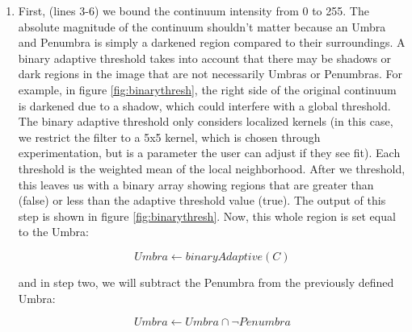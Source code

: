 \begin{enumerate}
    \item First, (lines 3-6) we bound the continuum intensity from 0 to 255. The absolute magnitude of the continuum shouldn't matter because an Umbra and Penumbra is simply a darkened region compared to their surroundings. A binary adaptive threshold \cite{scikit} takes into account that there may be shadows or dark regions in the image that are not necessarily Umbras or Penumbras. For example, in figure \ref{fig:binarythresh}, the right side of the original continuum is darkened due to a shadow, which could interfere with a global threshold. The binary adaptive threshold only considers localized kernels (in this case, we restrict the filter to a 5x5 kernel, which is chosen through experimentation, but is a parameter the user can adjust if they see fit). Each threshold is the weighted mean of the local neighborhood. After we threshold, this leaves us with a binary array showing regions that are greater than (false) or less than the adaptive threshold value (true). The output of this step is shown in figure \ref{fig:binarythresh}. Now, this whole region is set equal to the Umbra:
    
    $$Umbra \gets binaryAdaptive(C)$$
    
    and in step two, we will subtract the Penumbra from the previously defined Umbra:
    
    $$Umbra \gets Umbra \cap \neg Penumbra$$
    

\end{enumerate}

